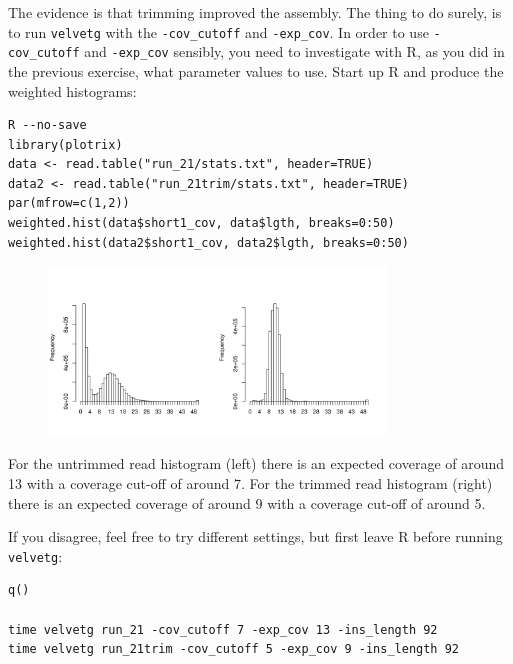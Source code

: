 \begin{steps}
The evidence is that trimming improved the assembly. The thing to do surely, is
to run \texttt{velvetg} with the \texttt{-cov\_cutoff} and \texttt{-exp\_cov}. In order
to use \texttt{-cov\_cutoff} and \texttt{-exp\_cov} sensibly, you need to
investigate with R, as you did in the previous exercise, what parameter values
to use. Start up R and produce the weighted histograms:
\begin{lstlisting}
R --no-save
library(plotrix) 
data <- read.table("run_21/stats.txt", header=TRUE) 
data2 <- read.table("run_21trim/stats.txt", header=TRUE) 
par(mfrow=c(1,2))
weighted.hist(data$short1_cov, data$lgth, breaks=0:50)
weighted.hist(data2$short1_cov, data2$lgth, breaks=0:50)
\end{lstlisting}

\begin{figure}[H]
\centering
\includegraphics[width=0.8\textwidth]{de_novo/velvet/velvet_Rplot002.png}
\caption{\label{fig:velvet_Rplot002}}
\end{figure}

For the untrimmed read histogram (left) there is an expected coverage of around
13 with a coverage cut-off of around 7. For the trimmed read histogram (right)
there is an expected coverage of around 9 with a coverage cut-off of around 5.

If you disagree, feel free to try different settings, but first leave R before
running \texttt{velvetg}:
\begin{lstlisting}
q()

time velvetg run_21 -cov_cutoff 7 -exp_cov 13 -ins_length 92
time velvetg run_21trim -cov_cutoff 5 -exp_cov 9 -ins_length 92
\end{lstlisting}

\end{steps}

